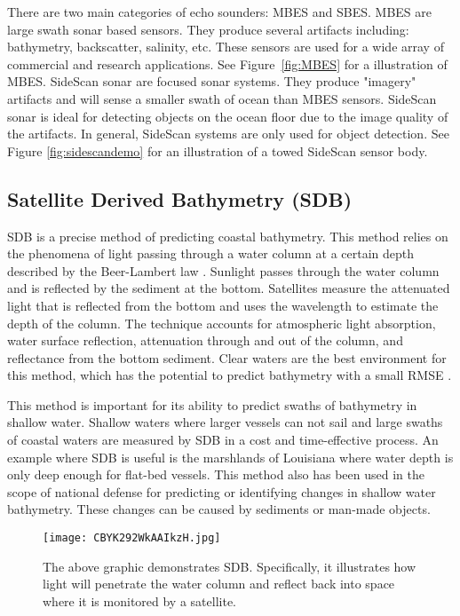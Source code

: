 There are two main categories of echo sounders: \ac{MBES} and \ac{SBES}.
\ac{MBES} are large swath sonar based sensors.
They produce several artifacts including: bathymetry, backscatter, salinity, etc.
These sensors are used for a wide array of commercial and research applications.
See Figure~\ref{fig:MBES} for a illustration of \ac{MBES}.
SideScan sonar are focused sonar systems.
They produce "imagery" artifacts and will sense a smaller swath of ocean than \ac{MBES} sensors.
SideScan sonar is ideal for detecting objects on the ocean floor due to the image quality of the artifacts.
In general, SideScan systems are only used for object detection.
See Figure \ref{fig:sidescandemo} for an illustration of a towed SideScan sensor body.




\subsection{Satellite Derived Bathymetry (SDB)}
\ac{SDB} is a precise method of predicting coastal bathymetry. 
This method relies on the phenomena of light passing through a water column at a certain depth described by the Beer-Lambert law \cite{chybicki2018three}\cite{vinayaraj2016satellite}.
Sunlight passes through the water column and is reflected by the sediment at the bottom.
Satellites measure the attenuated light that is reflected from the bottom and uses the wavelength to estimate the depth of the column.
The technique accounts for atmospheric light absorption, water surface reflection, attenuation through and out of the column, and reflectance from the bottom sediment.
Clear waters are the best environment for this method, which has the potential to predict bathymetry with a small RMSE \cite{chybicki2018three}.

\par
This method is important for its ability to predict swaths of bathymetry in shallow water.
Shallow waters where larger vessels can not sail and large swaths of coastal waters are measured by \ac{SDB} in a cost and time-effective process.
An example where \ac{SDB} is useful is the marshlands of Louisiana where water depth is only deep enough for flat-bed vessels.
This method also has been used in the scope of national defense for predicting or identifying changes in shallow water bathymetry.
These changes can be caused by sediments or man-made objects. 

\begin{figure}[htp]
    \centering
    \texttt{[image: CBYK292WkAAIkzH.jpg]}
    \caption{The above graphic demonstrates \ac{SDB}.
    Specifically, it illustrates how light will penetrate the water column and reflect back into space where it is monitored by a satellite.}
    \label{fig:sdb}
\end{figure}


